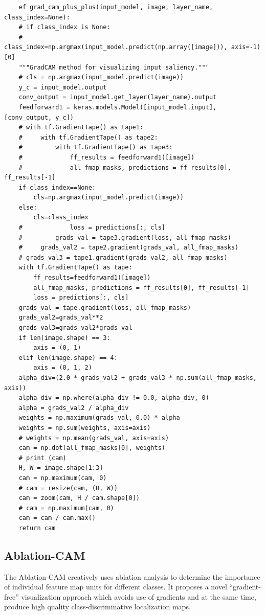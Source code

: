 \documentclass[conference]{IEEEtran}
\begin{document}
\begin{lstlisting}
    ef grad_cam_plus_plus(input_model, image, layer_name, class_index=None):
    # if class_index is None:
    #     class_index=np.argmax(input_model.predict(np.array([image])), axis=-1)[0]
    """GradCAM method for visualizing input saliency."""
    # cls = np.argmax(input_model.predict(image))
    y_c = input_model.output
    conv_output = input_model.get_layer(layer_name).output
    feedforward1 = keras.models.Model([input_model.input], [conv_output, y_c])
    # with tf.GradientTape() as tape1:
    #     with tf.GradientTape() as tape2:
    #         with tf.GradientTape() as tape3:
    #             ff_results = feedforward1([image])
    #             all_fmap_masks, predictions = ff_results[0], ff_results[-1]
    if class_index==None:
        cls=np.argmax(input_model.predict(image))
    else:
        cls=class_index
    #             loss = predictions[:, cls]
    #         grads_val = tape3.gradient(loss, all_fmap_masks)
    #     grads_val2 = tape2.gradient(grads_val, all_fmap_masks)
    # grads_val3 = tape1.gradient(grads_val2, all_fmap_masks)
    with tf.GradientTape() as tape:
        ff_results=feedforward1([image])
        all_fmap_masks, predictions = ff_results[0], ff_results[-1]
        loss = predictions[:, cls]
    grads_val = tape.gradient(loss, all_fmap_masks)
    grads_val2=grads_val**2
    grads_val3=grads_val2*grads_val
    if len(image.shape) == 3:
        axis = (0, 1)
    elif len(image.shape) == 4:
        axis = (0, 1, 2)
    alpha_div=(2.0 * grads_val2 + grads_val3 * np.sum(all_fmap_masks, axis))
    alpha_div = np.where(alpha_div != 0.0, alpha_div, 0)
    alpha = grads_val2 / alpha_div
    weights = np.maximum(grads_val, 0.0) * alpha
    weights = np.sum(weights, axis=axis)
    # weights = np.mean(grads_val, axis=axis)
    cam = np.dot(all_fmap_masks[0], weights)
    # print (cam)
    H, W = image.shape[1:3]
    cam = np.maximum(cam, 0)
    # cam = resize(cam, (H, W))
    cam = zoom(cam, H / cam.shape[0])
    # cam = np.maximum(cam, 0)
    cam = cam / cam.max()
    return cam
\end{lstlisting}
\subsection{Ablation-CAM}

The Ablation-CAM creatively uses ablation analysis to determine the importance of individual feature map units for different classes. It proposes a novel “gradient-free” visualization approach which avoids use of gradients and at the same time, produce high quality class-discriminative localization maps.\par
\end{document}

